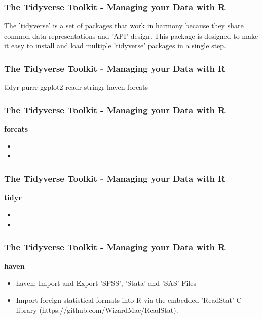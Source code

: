 
\begin{frame}
\frametitle{The Tidyverse Toolkit - Managing your Data with R}
\large

The 'tidyverse' is a set of packages that work in harmony because they share common data representations and 'API' design. 
This package is designed to make it easy to install and load multiple 'tidyverse' packages in a single step.

\end{frame}
\begin{frame}
\frametitle{The Tidyverse Toolkit - Managing your Data with R}
\large

tidyr
purrr
ggplot2
readr
stringr
haven
forcats

\end{frame}
\begin{frame}
\frametitle{The Tidyverse Toolkit - Managing your Data with R}
\large

\textbf{forcats}
\begin{itemize}
\item


\item 
\end{itemize}

\end{frame}
\begin{frame}
\frametitle{The Tidyverse Toolkit - Managing your Data with R}
\large

\textbf{tidyr}
\begin{itemize}
\item


\item 
\end{itemize}

\end{frame}
\begin{frame}
\frametitle{The Tidyverse Toolkit - Managing your Data with R}
\large

\textbf{haven}
\begin{itemize}
\item haven: Import and Export 'SPSS', 'Stata' and 'SAS' Files

\item  Import foreign statistical formats into R via the embedded 'ReadStat' C library (https://github.com/WizardMac/ReadStat).

\end{itemize}
\end{frame}
